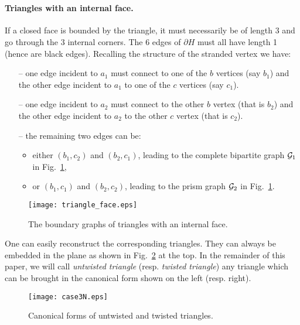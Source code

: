 \documentclass[10pt]{article}
\theoremstyle{plain}
\theoremstyle{definition}
\newcommand{\cG}{{\cal G}}
\begin{document}
\

\paragraph{Triangles with an internal face.} 
If a closed face is bounded by the triangle, it must necessarily be of length $3$ and go through the $3$ internal corners. 
The 6 edges of $\partial H$ must all have length 1 (hence are black edges). Recalling the structure of the stranded vertex we 
have:
\begin{itemize}
 \item[--] one edge incident to $a_1$ must connect to one of the $b$ vertices (say $b_1$) and the other edge incident to $a_1$ to one of the $c$ vertices (say $c_1$).
 \item[--] one edge incident to $a_2$ must connect to the other $b$ vertex (that is $b_2$) and the other edge incident to $a_2$ to the other $c$ vertex (that is $c_2$). 
 \item[--] the remaining two edges can be: 
    \begin{itemize}
     \item either $(b_1,c_2)$ and $(b_2,c_1)$, leading to the complete bipartite graph $\cG_1$ in Fig.~\ref{fig:triangle_face},
     \item or $(b_1,c_1)$ and $(b_2,c_2)$, leading to the prism graph $\cG_2$ in Fig.~\ref{fig:triangle_face}.
    \end{itemize}
\end{itemize} 

\begin{figure}[htb]
 \begin{center}
 \texttt{[image: triangle\_face.eps]}  
 \caption{The boundary graphs of triangles with an internal face.} \label{fig:triangle_face}
 \end{center}
 \end{figure}

 One can easily reconstruct the corresponding triangles. They can always be embedded in the plane as shown in Fig.~\ref{fig:cases3} at the top. 
 In the remainder of this paper, we will call \emph{untwisted triangle} (resp. \emph{twisted triangle}) any triangle which can be brought in the canonical form shown on the left (resp. right).
\begin{figure}[htb]
 \begin{center}
 \texttt{[image: case3N.eps]}  
 \caption{Canonical forms of untwisted and twisted triangles.} \label{fig:cases3}
 \end{center}
 \end{figure}
\end{document}
